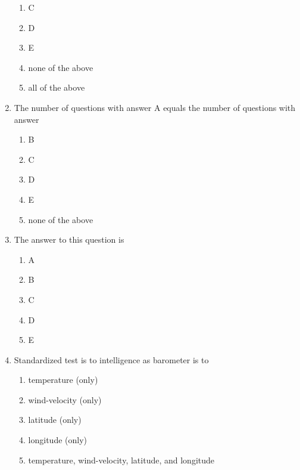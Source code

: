 \documentclass[twoside]{article}
\begin{document}
\begin{enumerate}
	\begin{enumerate}[label=(\Alph*)]
	\item C
	\item D
	\item E
	\item none of the above
	\item all of the above
	\end{enumerate}
\item The number of questions with answer A equals the number of questions with answer
	\begin{enumerate}[label=(\Alph*)]
	\item B
	\item C
	\item D
	\item E
	\item none of the above
	\end{enumerate}
\item The answer to this question is
	\begin{enumerate}[label=(\Alph*)]
	\item A
	\item B
	\item C
	\item D
	\item E
	\end{enumerate}
\item Standardized test is to intelligence as barometer is to
	\begin{enumerate}[label=(\Alph*)]
	\item temperature (only)
	\item wind-velocity (only)
	\item latitude (only)
	\item longitude (only)
	\item temperature, wind-velocity, latitude, and longitude
	\end{enumerate}
\end{enumerate}
\end{document}
